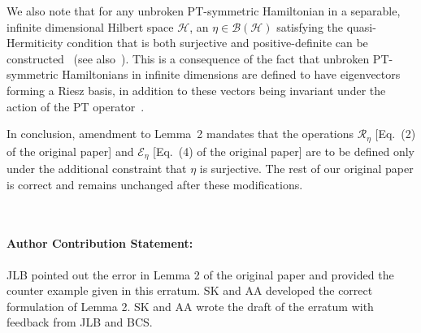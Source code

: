 \documentclass[amsmath,amssymb,aps,pra,superscriptaddress,twocolumn]{revtex4-2}
\begin{document}
We also note that for any unbroken PT-symmetric Hamiltonian in 
a separable, infinite dimensional Hilbert space $\mathscr{H}$, an $\eta \in \mathcal{B}(\mathscr{H})$
satisfying the quasi-Hermiticity condition 
that is both surjective and positive-definite can be constructed~\cite[Thm.~4.3]{Kar22}
(see also~\cite[Eq.~(23)]{BiOrthogonal}).
This is a consequence of the fact that unbroken PT-symmetric Hamiltonians in infinite dimensions are defined 
to have eigenvectors forming a Riesz basis, in addition to these vectors 
being invariant under the action of the PT operator~\cite{Mos10b}.


In conclusion, amendment to Lemma~2 mandates that the operations $\mathcal{R}_\eta$ [Eq.~(2) of the original paper] and $\mathcal{E}_\eta$ [Eq.~(4) of the original paper] are to be defined only under the additional constraint that $\eta$ is surjective. 
The rest of our original paper is correct and remains unchanged after these modifications.

\ 

\paragraph*{Author Contribution Statement:} JLB pointed out the error in Lemma 2 of the original paper and provided the counter example given in this erratum. SK and AA developed the correct formulation of Lemma 2. SK and AA wrote the draft of the erratum with feedback from JLB and BCS.

\pagebreak
\end{document}
